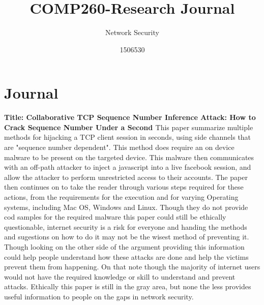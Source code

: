 \documentclass{scrartcl}
\title{COMP260-Research Journal}
\subtitle{Network Security}
\author{1506530}
\begin{document}
	
	
	\maketitle
	\section{Journal}
	
	\newline
	\newline
	\textbf{Title: Collaborative TCP Sequence Number Inference Attack: How to Crack Sequence Number Under a Second \cite{Inference}}
	\newline
This paper summarize multiple methods for hijacking a TCP client session in seconds, using side channels that are "sequence number dependent". This method does require an on device malware to be present on the targeted device. This malware then communicates with an off-path attacker to inject a javascript into a live facebook session, and allow the attacker to perform unrestricted access to their accounts. The paper then continues on to take the reader through various steps required for these actions, from the requirements for the execution and for varying Operating systems, including Mac OS, Windows and Linux. Though they do not provide cod samples for the required malware this paper could still be ethically questionable, internet security is a risk for everyone and handing the methods and sugestions on how to do it may not be the wisest method of preventing it. Though looking on the other side of the argument providing this information could help people understand how these attacks are done and help the victims prevent them from happening. On that note though the majority of internet users would not have the required knowledge or skill to understand and prevent attacks. Ethically this paper is still in the gray area, but none the less provides useful information to people on the gaps in network security.
	\newline
\end{document}
